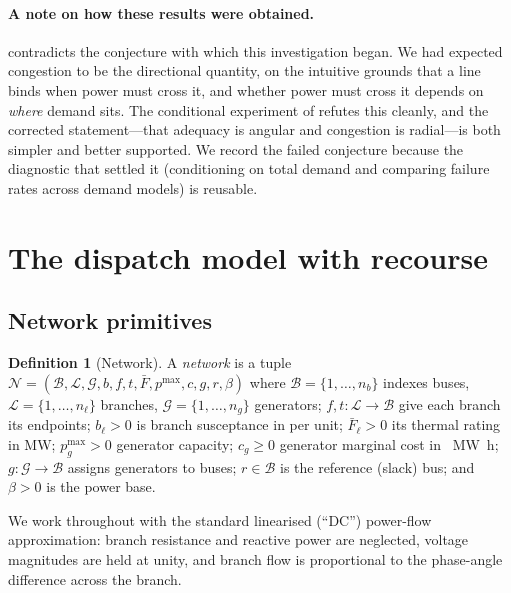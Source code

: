 \documentclass[11pt,a4paper]{article}
\theoremstyle{definition}
\newtheorem{definition}{Definition}[section]
\theoremstyle{plain}
\theoremstyle{remark}
\begin{document}
\paragraph{A note on how these results were obtained.}
 contradicts the conjecture with which this
investigation began. We had expected congestion to be the directional quantity,
on the intuitive grounds that a line binds when power must cross it, and whether
power must cross it depends on \emph{where} demand sits. The conditional
experiment of  refutes this cleanly, and the corrected
statement---that adequacy is angular and congestion is radial---is both simpler
and better supported. We record the failed conjecture because the diagnostic
that settled it (conditioning on total demand and comparing failure rates across
demand models) is reusable.

\section{The dispatch model with recourse}\label{sec:model}

\subsection{Network primitives}

\begin{definition}[Network]\label{def:network}
A \emph{network} is a tuple
$\mathcal{N} = (\mathcal{B}, \mathcal{L}, \mathcal{G}, b, f, t, \bar F, p^{\max}, c, g, r, \beta)$
where $\mathcal{B} = \{1,\dots,n_b\}$ indexes buses, $\mathcal{L} = \{1,\dots,n_\ell\}$
branches, $\mathcal{G} = \{1,\dots,n_g\}$ generators;
$f,t : \mathcal{L}\to\mathcal{B}$ give each branch its endpoints;
$b_\ell > 0$ is branch susceptance in per unit; $\bar F_\ell > 0$ its thermal
rating in \si{\mega\watt}; $p^{\max}_g > 0$ generator capacity;
$c_g \ge 0$ generator marginal cost in \si{\per\mega\watt\hour};
$g : \mathcal{G}\to\mathcal{B}$ assigns generators to buses;
$r \in \mathcal{B}$ is the reference (slack) bus; and $\beta > 0$ is the power base.
\end{definition}

We work throughout with the standard linearised (``DC'') power-flow
approximation: branch resistance and reactive power are neglected, voltage
magnitudes are held at unity, and branch flow is proportional to the phase-angle
difference across the branch.
\end{document}
